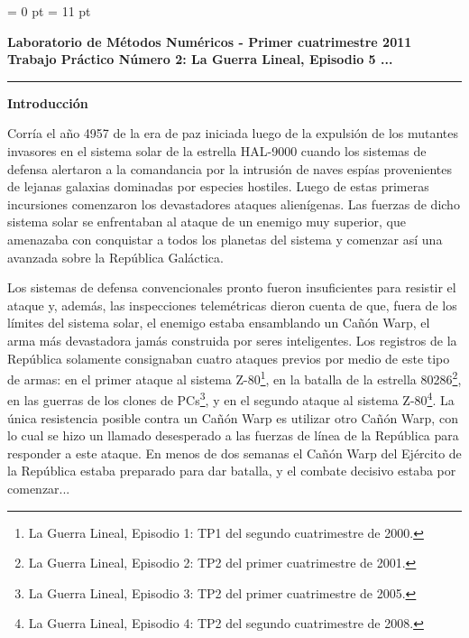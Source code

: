 \parindent = 0 pt
\parskip = 11 pt
\pagestyle{empty}

\newcommand{\real}{\ensuremath{\mathbb{R}}}

%

\begin{centering}
\bf Laboratorio de M\'etodos Num\'ericos - Primer cuatrimestre 2011 \\
Trabajo Pr\'actico N\'umero 2: La Guerra Lineal, Episodio 5 ... \\
\end{centering}

\vskip 25pt
\hrule
\vskip 11pt

{\bf Introducci\'on}

Corr\'ia el a\~no 4957 de la era de paz iniciada luego de la expulsi\'on de los mutantes invasores
en el sistema solar de la estrella HAL-9000 cuando los sistemas de defensa alertaron a la comandancia 
por la intrusi\'on de naves esp\'ias provenientes de lejanas galaxias dominadas por especies hostiles.
Luego de estas primeras incursiones comenzaron los devastadores ataques alien\'igenas. Las fuerzas de 
dicho sistema solar se enfrentaban al ataque de un enemigo muy superior, que amenazaba con
conquistar a todos los planetas del sistema y comenzar as\'i una avanzada sobre la Rep\'ublica
Gal\'actica.

Los sistemas de defensa convencionales pronto fueron insuficientes para resistir el ataque y, adem\'as, 
las inspecciones telem\'etricas dieron cuenta de que, fuera de los l\'imites del sistema solar, el
enemigo estaba ensamblando un Ca\~n\'on Warp, el arma m\'as devastadora jam\'as construida por seres
inteligentes. Los registros de la Rep\'ublica solamente consignaban cuatro ataques previos por
medio de este tipo de armas: en el primer ataque al sistema Z-80\footnote{La Guerra Lineal, 
Episodio 1: TP1 del segundo cuatrimestre de 2000.}, en la batalla de la estrella 80286\footnote
{La Guerra Lineal, Episodio 2: TP2 del primer cuatrimestre de 2001.}, en las guerras de los clones 
de PCs\footnote{La Guerra Lineal, Episodio 3: TP2 del primer cuatrimestre de 2005.}, y en el segundo 
ataque al sistema Z-80\footnote{La Guerra Lineal, Episodio 4: TP2 del segundo cuatrimestre de 2008.}.
La \'unica resistencia posible contra un Ca\~n\'on Warp es utilizar otro Ca\~n\'on Warp, con lo
cual se hizo un llamado desesperado a las fuerzas de l\'inea de la Rep\'ublica para responder a
este ataque. En menos de dos semanas el Ca\~n\'on Warp del Ej\'ercito de la Rep\'ublica estaba
preparado para dar batalla, y el combate decisivo estaba por comenzar...

